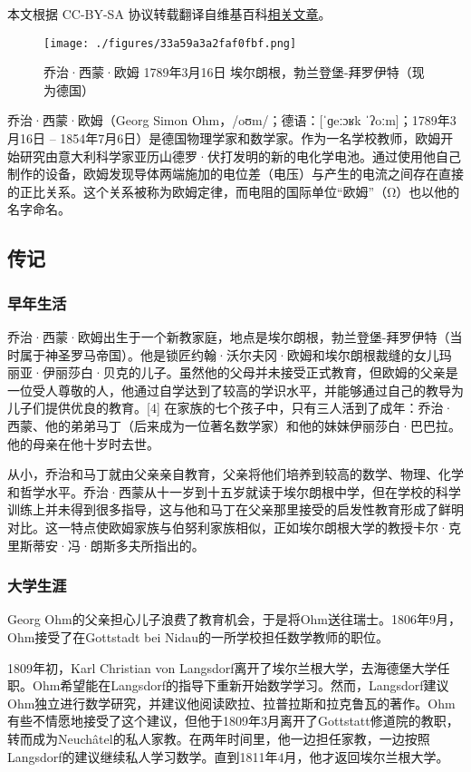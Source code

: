 
本文根据 CC-BY-SA 协议转载翻译自维基百科\href{https://en.wikipedia.org/wiki/Georg_Ohm}{相关文章}。

\begin{figure}[ht]
\centering
\texttt{[image: ./figures/33a59a3a2faf0fbf.png]}
\caption{乔治·西蒙·欧姆  1789年3月16日  埃尔朗根，勃兰登堡-拜罗伊特（现为德国）} \label{fig_GOM_1}
\end{figure}

乔治·西蒙·欧姆（Georg Simon Ohm，/oʊm/；德语：[ˈɡeːɔʁk ˈʔoːm]；1789年3月16日 – 1854年7月6日）是德国物理学家和数学家。作为一名学校教师，欧姆开始研究由意大利科学家亚历山德罗·伏打发明的新的电化学电池。通过使用他自己制作的设备，欧姆发现导体两端施加的电位差（电压）与产生的电流之间存在直接的正比关系。这个关系被称为欧姆定律，而电阻的国际单位“欧姆”（Ω）也以他的名字命名。
\subsection{传记}
\subsubsection{早年生活}  
乔治·西蒙·欧姆出生于一个新教家庭，地点是埃尔朗根，勃兰登堡-拜罗伊特（当时属于神圣罗马帝国）。他是锁匠约翰·沃尔夫冈·欧姆和埃尔朗根裁缝的女儿玛丽亚·伊丽莎白·贝克的儿子。虽然他的父母并未接受正式教育，但欧姆的父亲是一位受人尊敬的人，他通过自学达到了较高的学识水平，并能够通过自己的教导为儿子们提供优良的教育。[4] 在家族的七个孩子中，只有三人活到了成年：乔治·西蒙、他的弟弟马丁（后来成为一位著名数学家）和他的妹妹伊丽莎白·巴巴拉。他的母亲在他十岁时去世。

从小，乔治和马丁就由父亲亲自教育，父亲将他们培养到较高的数学、物理、化学和哲学水平。乔治·西蒙从十一岁到十五岁就读于埃尔朗根中学，但在学校的科学训练上并未得到很多指导，这与他和马丁在父亲那里接受的启发性教育形成了鲜明对比。这一特点使欧姆家族与伯努利家族相似，正如埃尔朗根大学的教授卡尔·克里斯蒂安·冯·朗斯多夫所指出的。
\subsubsection{大学生涯}
Georg Ohm的父亲担心儿子浪费了教育机会，于是将Ohm送往瑞士。1806年9月，Ohm接受了在Gottstadt bei Nidau的一所学校担任数学教师的职位。

1809年初，Karl Christian von Langsdorf离开了埃尔兰根大学，去海德堡大学任职。Ohm希望能在Langsdorf的指导下重新开始数学学习。然而，Langsdorf建议Ohm独立进行数学研究，并建议他阅读欧拉、拉普拉斯和拉克鲁瓦的著作。Ohm有些不情愿地接受了这个建议，但他于1809年3月离开了Gottstatt修道院的教职，转而成为Neuchâtel的私人家教。在两年时间里，他一边担任家教，一边按照Langsdorf的建议继续私人学习数学。直到1811年4月，他才返回埃尔兰根大学。
